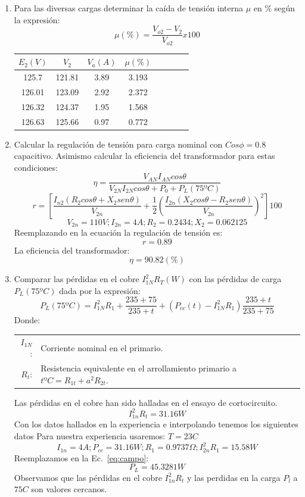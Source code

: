 \begin{enumerate}
    \item Para las diversas cargas determinar la caída de tensión interna $\mu$ en \% según la expresión:
    \[\mu(\%)=\frac{V_{o2}-V_{2}}{V_{o2}}x100\]
    \begin{center}
        \begin{tabular}{ |c|c|c|c|c|c|c|c| } 
            \hline
            $E_{2}(V)$ & $V_{2}$ & $V_{a}(A)$ & $\mu(\%)$ \\
            \hline
            125.7 & 121.81 & 3.89 & 3.193\\
            126.01 & 123.09 & 2.92 & 2.372\\
            126.32 & 124.37 & 1.95 & 1.568\\
            126.63 & 125.66 & 0.97 & 0.772\\
            \hline
        \end{tabular}
    \end{center}
    
    \item Calcular la regulación de tensión para carga nominal con $Cos\phi=0.8$ capacitivo. Asimismo calcular la eficiencia del transformador para estas condiciones:
    \[\eta=\frac{V_{AN}I_{AN}cos\theta}{V_{2N}I_{2N}cos\theta+P_{0}+P_{L}(75ºC)}\]
    \[r=\left[\frac{I_{n2}\left(R_{2}cos\theta+X_{2}sen\theta\right)}{V_{2n}}+\frac{1}{2}\left(\frac{I_{2n}\left(X_{2}cos\theta-R_{2}sen\theta\right)}{V_{2n}}\right)^2\right]100\]
    \[V_{2n}=110V;I_{2n}=4A;R_{2}=0.2434;X_{2}=0.062125\]
    Reemplazando en la ecuación la regulación de tensión es:
    \[r=0.89\]
    La eficiencia del transformador:
    \[\eta=90.82(\%)\]
    
    \item Comparar las pérdidas en el cobre $I_{1N}^2R_{T}(W)$ con las pérdidas de carga $P_{L}(75ºC)$ dada por la expresión:
    \begin{equation}
    \label{eq:campo}
        P_{L}(75ºC)=I_{1N}^2R_{1}+\frac{235+75}{235+t}+\left(P_{cc}(t)-I_{1N}^2R_{1}\right)\frac{235+t}{235+75}
    \end{equation}
    Donde:\\
    \hspace*{3em}
    \begin{tabular}{rl}
        $I_{1N}$:& Corriente nominal en el primario. \\
        $R_{t}$:& Resistencia equivalente en el arrollamiento primario a $tºC=R_{1t}+a^2R_{2t}$. \\
    \end{tabular}
    Las pérdidas en el cobre han sido halladas en el ensayo de cortocircuito.
    \[I_{1n}^2R_{t}=31.16W\]
    Con los datos hallados en la experiencia e interpolando tenemos los siguientes datos Para nuestra experiencia usaremos: $T=23C$
    \[I_{1n}=4A;P_{cc}=31.16W;R_{1}=0.9737\Omega;I_{2n}^2R_{1}=15.58W\]
    Reemplazamos en la Ec.~\eqref{eq:campo}:
    \[P_{L}=45.3281W\]
    Observamos que las pérdidas en el cobre $I_{1n}^2R_{t}$ y las perdidas en la carga $P_{l}$ a $75C$ son valores cercanos.
\end{enumerate}

